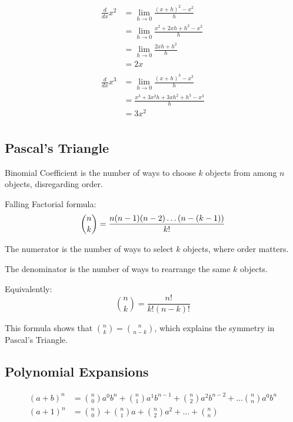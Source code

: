 \documentclass[letterpaper, portrait]{exam}
\begin{document}
  \begin{align*}
    \frac{d}{dx} x^2 & = \lim_{h \to 0} \frac{(x + h)^2 - x^2}{h} \\
                     & = \lim_{h \to 0} \frac{x^2 + 2xh + h^2 - x^2}{h} \\
                     & = \lim_{h \to 0} \frac{2xh + h^2}{h} \\
                     & = 2x \\
    \\
    \frac{d}{dx} x^3 & = \lim_{h \to 0} \frac{(x + h)^3 - x^3}{h} \\
                     & = \frac{x^3 + 3x^2h + 3xh^2 + h^3 - x^3}{h} \\
                     & = 3x^2 \\
  \end{align*}

  \subsection{Pascal's Triangle}

  Binomial Coefficient is the number of ways to choose $k$ objects from among $n$ objects,
  disregarding order.

  Falling Factorial formula:
  \[
    \binom{n}{k}  = \frac{n(n - 1)(n - 2)\dots(n - (k - 1))}{k!} \\
  \]

  \begin{itemize*}
     \item The numerator is the number of ways to select $k$ objects, where order matters.
     \item The denominator is the number of ways to rearrange the same $k$ objects.
  \end{itemize*}

  Equivalently:
  \[
    \binom{n}{k} = \frac{n!}{k! (n - k)!}
  \]

  This formula shows that $\binom{n}{k} = \binom{n}{n - k}$, which explains the symmetry
  in Pascal's Triangle.

  \subsection{Polynomial Expansions} %
  \label{sub:pe}
  
  \begin{align*}
    (a + b)^n &= \binom{n}{0} a^0 b^n + \binom{n}{1} a^1 b^{n - 1} + \binom{n}{2} a^2 b^{n - 2} + \dots \binom{n}{n} a^0 b^{n} \\
    (a + 1)^n &= \binom{n}{0} + \binom{n}{1} a + \binom{n}{2} a^2 + \dots + \binom{n}{n} \\
  \end{align*}
\end{document}
